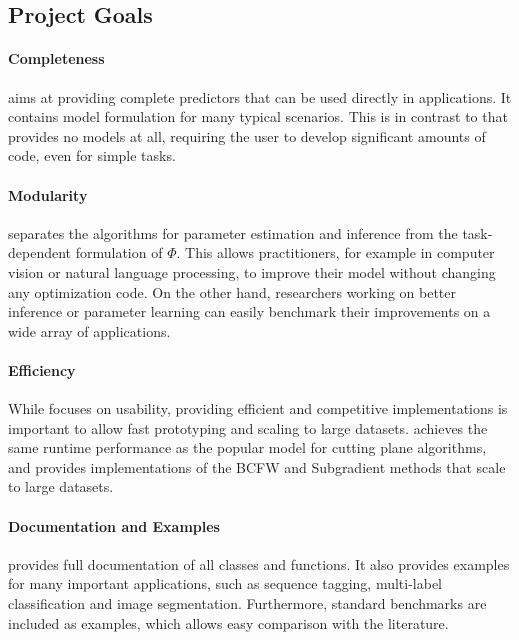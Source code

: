 \subsection{Project Goals}\label{sec:goals}

\paragraph{Completeness}
    \pystruct aims at providing complete predictors that can be used directly in
    applications. It contains model formulation for many typical scenarios.
    This is in contrast to \svmstruct that provides no models at all, requiring the
    user to develop significant amounts of code, even for simple tasks.

\paragraph{Modularity}
    \pystruct separates the algorithms for parameter estimation and
     inference from the task-dependent formulation of $\Phi$. This allows
     practitioners, for example in computer vision or natural language
     processing, to improve their model without changing any optimization
     code. On the other hand, researchers working on better inference or
     parameter learning can easily benchmark their improvements on a wide
     array of applications.

\paragraph{Efficiency}
     While \pystruct focuses on usability, providing efficient and competitive
     implementations is important to allow fast prototyping and scaling to
     large datasets. \pystruct achieves the same runtime performance
     as the popular \svmstruct model for cutting plane algorithms, and
     provides implementations of the BCFW and Subgradient methods that scale to
     large datasets.

\paragraph{Documentation and Examples}
     \pystruct provides full documentation of all classes and functions.  It
     also provides examples for many important applications, such as
     sequence tagging, multi-label classification and image segmentation.
     Furthermore, standard benchmarks are included as examples, which allows
     easy comparison with the literature.

